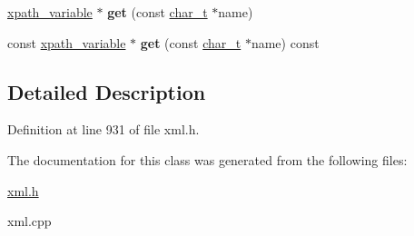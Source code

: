 \begin{DoxyCompactItemize}
\item 
\hypertarget{classphys_1_1xml_1_1xpath__variable__set_a0fbe3b1575987de76bff41b1355922c4}{
\hyperlink{classphys_1_1xml_1_1xpath__variable}{xpath\_\-variable} $\ast$ {\bfseries get} (const \hyperlink{namespacephys_1_1xml_afc87705cd1c2917d87b879715a2d8f6e}{char\_\-t} $\ast$name)}
\label{d8/d65/classphys_1_1xml_1_1xpath__variable__set_a0fbe3b1575987de76bff41b1355922c4}

\item 
\hypertarget{classphys_1_1xml_1_1xpath__variable__set_a719e167cebc050d4baa11925f3302380}{
const \hyperlink{classphys_1_1xml_1_1xpath__variable}{xpath\_\-variable} $\ast$ {\bfseries get} (const \hyperlink{namespacephys_1_1xml_afc87705cd1c2917d87b879715a2d8f6e}{char\_\-t} $\ast$name) const }
\label{d8/d65/classphys_1_1xml_1_1xpath__variable__set_a719e167cebc050d4baa11925f3302380}

\end{DoxyCompactItemize}


\subsection{Detailed Description}


Definition at line 931 of file xml.h.



The documentation for this class was generated from the following files:\begin{DoxyCompactItemize}
\item 
\hyperlink{xml_8h}{xml.h}\item 
xml.cpp\end{DoxyCompactItemize}
